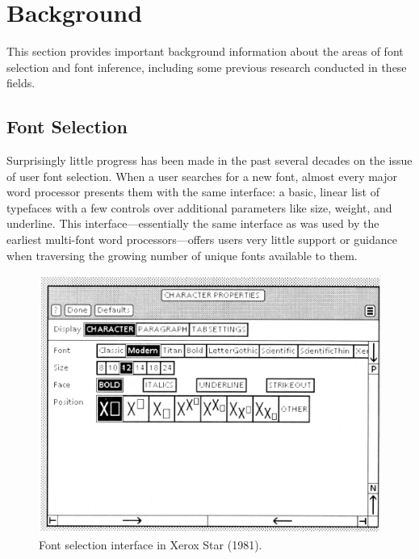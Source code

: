 \chapter{Background}
\label{chap:background}

This section provides important background information about the areas of font selection and font inference, including some previous research conducted in these fields.

\section{Font Selection}

Surprisingly little progress has been made in the past several decades on the issue of user font selection. When a user searches for a new font, almost every major word processor presents them with the same interface: a basic, linear list of typefaces with a few controls over additional parameters like size, weight, and underline. This interface—essentially the same interface as was used by the earliest multi-font word processors—offers users very little support or guidance when traversing the growing number of unique fonts available to them.

\begin{figure}[htbp]
    \centering
    \includegraphics[width=.8\textwidth]{images/xerox-star.png}
    \caption{Font selection interface in Xerox Star (1981).}
    \label{fig:xerox-star}
\end{figure}

